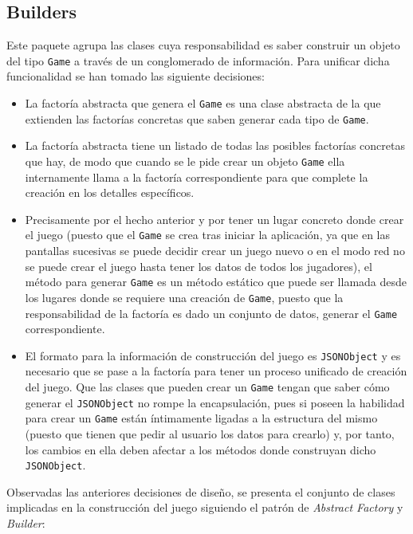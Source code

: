 \documentclass[12pt,a4paper,openright]{book}
\theoremstyle{break}
\begin{document}
\subsection{Builders}
Este paquete agrupa las clases cuya responsabilidad es saber construir un objeto del tipo \texttt{Game} a través de un conglomerado de información. Para unificar dicha funcionalidad se han tomado las siguiente decisiones:
\begin{itemize}
\item La factoría abstracta que genera el \texttt{Game} es una clase abstracta de la que extienden las factorías concretas que saben generar cada tipo de \texttt{Game}.

\item La factoría abstracta tiene un listado de todas las posibles factorías concretas que hay, de modo que cuando se le pide crear un objeto \texttt{Game} ella internamente llama a la factoría correspondiente para que complete la creación en los detalles específicos.

\item Precisamente por el hecho anterior y por tener un lugar concreto donde crear el juego (puesto que el \texttt{Game} se crea tras iniciar la aplicación, ya que en las pantallas sucesivas se puede decidir crear un juego nuevo o en el modo red no se puede crear el juego hasta tener los datos de todos los jugadores), el método para generar \texttt{Game} es un método estático que puede ser llamada desde los lugares donde se requiere una creación de \texttt{Game}, puesto que la responsabilidad de la factoría es dado un conjunto de datos, generar el \texttt{Game} correspondiente.

\item El formato para la información de construcción del juego es \texttt{JSONObject} y es necesario que se pase a la factoría para tener un proceso unificado de creación del juego. Que las clases que pueden crear un \texttt{Game} tengan que saber cómo generar el \texttt{JSONObject} no rompe la encapsulación, pues si poseen la habilidad para crear un \texttt{Game} están íntimamente ligadas a la estructura del mismo (puesto que tienen que pedir al usuario los datos para crearlo) y, por tanto, los cambios en ella deben afectar a los métodos donde construyan dicho \texttt{JSONObject}.
\end{itemize}

Observadas las anteriores decisiones de diseño, se presenta el conjunto de clases implicadas en la construcción del juego siguiendo el patrón de \textit{Abstract Factory} y \textit{Builder}:
\end{document}
